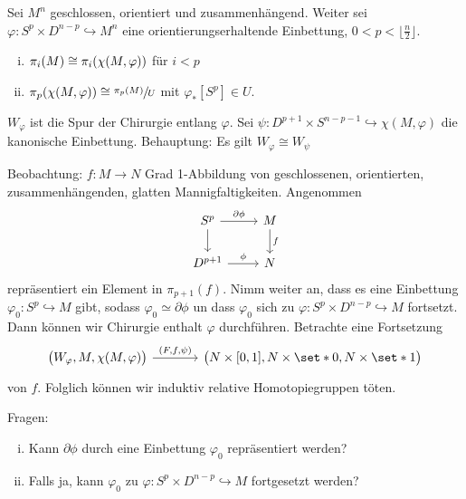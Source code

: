 \begin{lemma}
	Sei $M^n$ geschlossen, orientiert und zusammenhängend.
	Weiter sei $\varphi \colon S^p \times D^{n-p} \hookrightarrow M^n$ eine orientierungserhaltende Einbettung, $0 < p < \lfloor \frac{n}{2} \rfloor$.
	\begin{enumerate}[(i)]
		\item $\pi_i(M) \cong \pi_i \enbrace*{\chi(M,\varphi)}$ für $i<p$
		\item $\pi_p \enbrace*{\chi(M,\varphi)} \cong \sfrac{\pi_p(M)}{U}$ mit $\varphi_*[S^p] \in U$.
	\end{enumerate}
\end{lemma}
\begin{beweis}[Skizze]
	$W_\varphi$ ist die Spur der Chirurgie entlang $\varphi$. 
	Sei $\psi \colon D^{p+1} \times S^{n-p-1} \hookrightarrow \chi(M,\varphi)$ die kanonische Einbettung.
	Behauptung: Es gilt $W_\varphi \cong W_\psi$
	
\end{beweis}

Beobachtung: $f \colon M \to N$ Grad 1-Abbildung von geschlossenen, orientierten, zusammenhängenden, glatten Mannigfaltigkeiten.
Angenommen
\[
	\begin{tikzcd}
		S^p \rar["\partial \phi"] \dar & M \dar["f"] \\
		D^{p+1} \rar["\phi"] & N
	\end{tikzcd}
\]
repräsentiert ein Element in $\pi_{p+1}(f)$.
Nimm weiter an, dass es eine Einbettung $\varphi_0\colon S^p \hookrightarrow M$ gibt, sodass $\varphi_0 \simeq \partial \phi$ un dass $\varphi_0$ sich zu $\varphi \colon S^p \times D^{n-p} \hookrightarrow M$ fortsetzt.
Dann können wir Chirurgie enthalt $\varphi$ durchführen.
Betrachte eine Fortsetzung
\[
	\begin{tikzcd}[sep=large]
		\enbrace[\big]{W_\varphi,M,\chi(M,\varphi)} \rar["{(F,f,\psi)}"] & \enbrace[\big]{N \times [0,1], N \times \set*{0}, N \times \set*{1}}
	\end{tikzcd}
\]
von $f$.
Folglich können wir induktiv relative Homotopiegruppen töten.

Fragen:
\begin{enumerate}[(i)]
	\item Kann $\partial \phi$ durch eine Einbettung $\varphi_0$ repräsentiert werden?
	\item Falls ja, kann $\varphi_0$ zu $\varphi \colon S^p \times D^{n-p} \hookrightarrow M$ fortgesetzt werden?
\end{enumerate}

